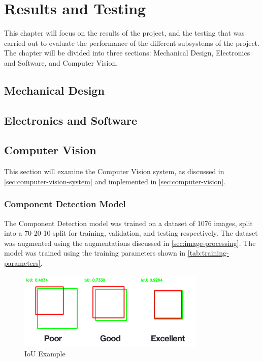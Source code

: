 \section{Results and Testing}
\label{sec:results-and-testing}
This chapter will focus on the results of the project, and the testing that was carried out to evaluate the performance of the different subsystems of the project. The chapter will be divided into three sections: Mechanical Design, Electronics and Software, and Computer Vision.

\subsection{Mechanical Design}

\subsection{Electronics and Software}

\subsection{Computer Vision}
\label{sec:computer-vision-evaluation}
This section will examine the Computer Vision system, as discussed in \autoref{sec:computer-vision-system} and implemented in \autoref{sec:computer-vision}.

\subsubsection{Component Detection Model}
The Component Detection model was trained on a dataset of 1076 images, split into a 70-20-10 split for training, validation, and testing respectively. The dataset was augmented using the augmentations discussed in \autoref{sec:image-processing}. The model was trained using the training parameters shown in \autoref{tab:training-parameters}.

\begin{figure}[H]
    \centering
    \includegraphics[width=0.8\textwidth]{imgs/articles/iou.png}
    \caption{IoU Example \cite{rosebrock_2016}}
    \label{fig:iou}
  \end{figure}
  

